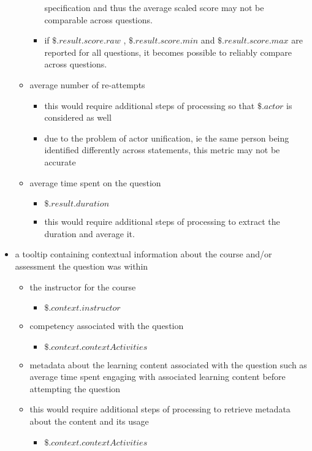 \documentclass{article}
\begin{document}
\begin{itemize}
\begin{itemize}
\begin{itemize}
      specification and thus the average scaled score may not be
      comparable across questions.
    \item if $\$.result.score.raw$ , $\$.result.score.min$ and
      $\$.result.score.max$ are reported for all questions, it becomes
      possible to reliably compare across questions.
    \end{itemize}
  \item average number of re-attempts
    \begin{itemize}
      \item this would require additional steps of processing so that
        $\$.actor$ is considered as well
      \item due to the problem of actor unification, ie the same
        person being identified differently across statements, this
        metric may not be accurate
      \end{itemize}
    \item average time spent on the question
      \begin{itemize}
      \item $\$.result.duration$
      \item this would require additional steps of processing to
        extract the duration and average it.
      \end{itemize}
    \end{itemize}
  \item a tooltip containing contextual information about the course
    and/or assessment the question was within
    \begin{itemize}
    \item the instructor for the course
      \begin{itemize}
      \item $\$.context.instructor$
      \end{itemize}
    \item competency associated with the question
      \begin{itemize}
      \item $\$.context.contextActivities$
      \end{itemize}
    \item metadata about the learning content associated with the
      question such as average time spent engaging with associated
      learning content before attempting the question
    \item this would require additional steps of processing to
      retrieve metadata about the content and its usage
      \begin{itemize}
      \item $\$.context.contextActivities$
      \end{itemize}
    \end{itemize}
\end{itemize}
\end{document}

